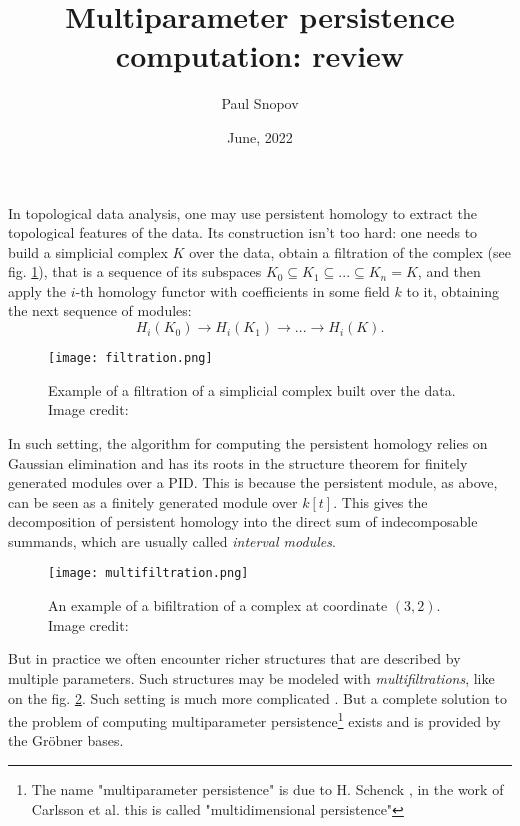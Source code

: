 \documentclass[a4paper,8pt,epsfig]{article}
\title{Multiparameter persistence computation: review}
\author{Paul Snopov}
\date{June, 2022}
\begin{document}
	\maketitle
	 In topological data analysis, one may use persistent homology to extract the topological features of the data. Its construction isn't too hard: one needs to build a simplicial complex $K$ over the data, obtain a filtration of the complex (see fig. \ref{fig:filtration}), that is a sequence of its subspaces $K_0 \subseteq K_1 \subseteq ... \subseteq K_n = K$, and then apply the $i$-th homology functor with coefficients in some field $k$ to it, obtaining the next sequence of modules:
	 \[
	 	H_i(K_0) \to H_i(K_1) \to ... \to H_i(K).
	 \]
	 
	 \begin{figure}
	 	\centering
	 	\texttt{[image: filtration.png]}
	 	\caption{Example of a filtration of a simplicial complex built over the data. Image credit: \cite{image1}}
	 	\label{fig:filtration}
	 \end{figure}
	 
	 In such setting, the algorithm for computing the persistent homology relies on Gaussian elimination and has its roots in the structure theorem for finitely generated modules over a PID. This is because the persistent module, as above, can be seen as a finitely generated module over $k[t]$. This gives the decomposition of persistent homology into the direct sum of indecomposable summands, which are usually called {\it interval modules}. 
	 
	 \begin{figure}
	 	\centering
	 	\texttt{[image: multifiltration.png]}
	 	\caption{An example of a bifiltration of a complex at coordinate $(3,2)$. Image credit: \cite{image2}}
	 	\label{fig:multifiltration}
	 \end{figure}
	  
	 But in practice we often encounter richer structures that are described by multiple parameters. Such structures may be modeled with  {\it multifiltrations}, like on the fig. \ref{fig:multifiltration}. Such setting is much more complicated \cite{theormulpers}. But a complete solution to the problem of computing multiparameter persistence\footnote{The name "multiparameter persistence" is due to H. Schenck \cite{schenck}, in the work of Carlsson et al. this is called "multidimensional persistence"} exists and is provided by the Gröbner bases.
	
\end{document}
